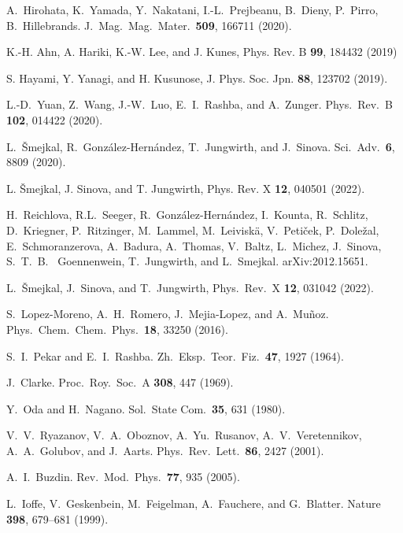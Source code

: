 \documentclass[aps,twocolumn,amsmath,amssymb,preprintnumbers,floatfix,prl,superscriptaddress,longbibliography]{revtex4-2}%
\begin{document}
\begin{thebibliography}{999}

	A.~Hirohata, K.~Yamada, Y.~Nakatani, I.-L.~Prejbeanu, B.~Dieny, P.~Pirro, B.~Hillebrands.
	J.~Mag.~Mag.~Mater.~\textbf{509}, 166711 (2020).



 K.-H. Ahn, A. Hariki, K.-W. Lee, and J. Kunes,  Phys. Rev. B \textbf{99}, 184432 (2019)

 S. Hayami, Y. Yanagi, and H. Kusunose, J. Phys. Soc. Jpn. \textbf{88}, 123702 (2019).


	L.-D.~Yuan, Z.~Wang, J.-W.~Luo, E.~I.~Rashba, and A.~Zunger.
	Phys.~Rev.~B \textbf{102}, 014422 (2020).

	L.~Šmejkal, R.~González-Hernández, T.~Jungwirth, and J.~Sinova.
	Sci.~Adv.~\textbf{6}, 8809 (2020).


 L. Šmejkal, J. Sinova, and T. Jungwirth, Phys. Rev. X \textbf{12}, 040501 (2022).

	H.~Reichlova, R.L.~Seeger, R.~González-Hernández, I.~Kounta, R.~Schlitz, D.~Kriegner, P.~Ritzinger, M.~Lammel, M.~Leiviskä, V.~Petiček, P.~Doležal, E.~Schmoranzerova, A.~Badura, A.~Thomas, V.~Baltz, L.~Michez, J.~Sinova, S.~T.~B.~ Goennenwein, T.~Jungwirth, and L.~Smejkal.
	arXiv:2012.15651.

	L.~Šmejkal, J.~Sinova, and T.~Jungwirth, Phys.~Rev.~X \textbf{12}, 031042 (2022).

	S.~Lopez-Moreno, A.~H.~Romero, J.~Mejia-Lopez, and A.~Muñoz.
	Phys.~Chem.~Chem.~Phys.~\textbf{18}, 33250 (2016).

	S.~I.~Pekar and E.~I.~Rashba.
	Zh.~Eksp.~Teor.~Fiz.~\textbf{47}, 1927 (1964).

	J.~Clarke.
	Proc.~Roy.~Soc.~A \textbf{308}, 447 (1969).

	Y.~Oda and H.~Nagano.
	Sol.~State Com.~\textbf{35}, 631 (1980).

	V.~V.~Ryazanov, V.~A.~Oboznov, A.~Yu.~Rusanov, A.~V.~Veretennikov, A.~A.~Golubov, and J.~Aarts.
	Phys.~Rev.~Lett.~\textbf{86}, 2427 (2001).

	A.~I.~Buzdin.
	Rev.~Mod.~Phys.~\textbf{77}, 935 (2005).

	L.~Ioffe, V.~Geskenbein, M.~Feigelman, A.~Fauchere, and G.~Blatter.
	Nature \textbf{398}, 679–681 (1999).


\end{thebibliography}
\end{document}
